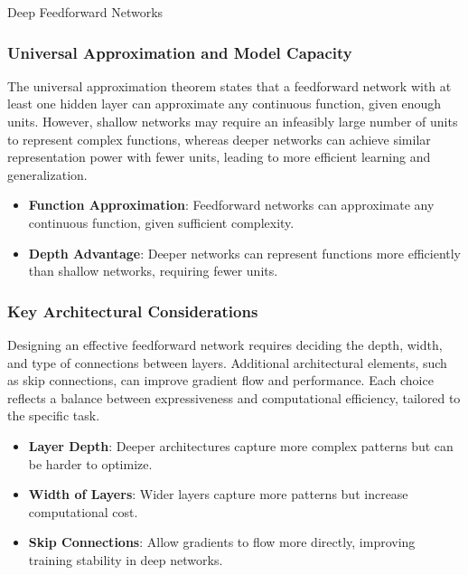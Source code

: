 \begin{notes}{Deep Feedforward Networks}
    \subsubsection*{Universal Approximation and Model Capacity}
    
    The universal approximation theorem states that a feedforward network with at least one hidden layer can approximate any continuous function, given enough units. However, shallow networks may require 
    an infeasibly large number of units to represent complex functions, whereas deeper networks can achieve similar representation power with fewer units, leading to more efficient learning and generalization.
    
    \begin{highlight}
        \begin{itemize}
            \item \textbf{Function Approximation}: Feedforward networks can approximate any continuous function, given sufficient complexity.
            \item \textbf{Depth Advantage}: Deeper networks can represent functions more efficiently than shallow networks, requiring fewer units.
        \end{itemize}
    \end{highlight}
    
    \subsubsection*{Key Architectural Considerations}
    
    Designing an effective feedforward network requires deciding the depth, width, and type of connections between layers. Additional architectural elements, such as skip connections, can improve gradient 
    flow and performance. Each choice reflects a balance between expressiveness and computational efficiency, tailored to the specific task.
    
    \begin{highlight}
        \begin{itemize}
            \item \textbf{Layer Depth}: Deeper architectures capture more complex patterns but can be harder to optimize.
            \item \textbf{Width of Layers}: Wider layers capture more patterns but increase computational cost.
            \item \textbf{Skip Connections}: Allow gradients to flow more directly, improving training stability in deep networks.
        \end{itemize}
    \end{highlight}
    

\end{notes}
